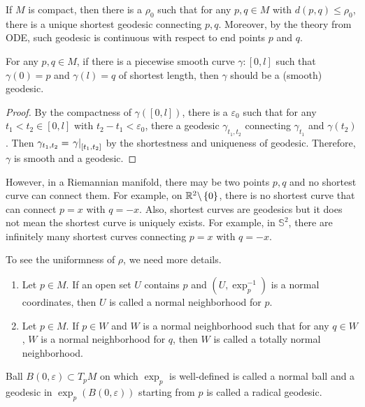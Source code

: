 \begin{cor}\label{cor:cptshort}
	If $M$ is compact, then there is a $\rho_0$ such that for any $p,q \in M$ with $d(p,q) \leq \rho_0$, there is a unique shortest geodesic connecting $p,q$. Moreover, by the theory from ODE, such geodesic is continuous with respect to end points $p$ and $q$.
\end{cor}

\begin{cor}
	For any $p,q \in M$, if there is a piecewise smooth curve $\gamma \colon [0,l]$ such that $\gamma(0) = p$ and $\gamma(l) = q$ of shortest length, then $\gamma$ should be a (smooth) geodesic.
\end{cor}
\begin{proof}
	By the compactness of $\gamma([0,l])$, there is a $\varepsilon_0$ such that for any $t_1<t_2 \in [0,l]$ with $t_2-t_1 < \varepsilon_0$, there a geodesic $\gamma_{t_1,t_2}$ connecting $\gamma_{t_1}$ and $\gamma(t_2)$. Then $\gamma_{t_1,t_2} = \left.\gamma\right\lvert_{[t_1,t_2]}$ by the shortestness and uniqueness of geodesic. Therefore, $\gamma$ is smooth and a geodesic.
\end{proof}
\begin{rmk}
	However, in a Riemannian manifold, there may be two points $p,q$ and no shortest curve can connect them. For example, on $\mathbb{R}^2 \backslash \left\{0\right\}$, there is no shortest curve that can connect $p = x$ with $q = -x$. Also, shortest curves are geodesics but it does not mean the shortest curve is uniquely exists. For example, in $\mathbb{S}^2$, there are infinitely many shortest curves connecting $p=x$ with $q = -x$.
\end{rmk}

\noindent To see the uniformness of $\rho$, we need more details.
\begin{defn}
	\begin{enumerate}[label=(\arabic{*})]
		\item Let $p \in M$. If an open set $U$ contains $p$ and $(U,\exp_p^{-1})$ is a normal coordinates, then $U$ is called a normal neighborhood for $p$.
		\item Let $p \in M$. If $p \in W$ and $W$ is a normal neighborhood such that for any $q \in W$, $W$ is a normal neighborhood for $q$, then $W$ is called a totally normal neighborhood.
	\end{enumerate}
\end{defn}
\begin{rmk}
	Ball $B(0,\varepsilon) \subset T_pM$ on which $\exp_p$ is well-defined is called a normal ball and a geodesic in $\exp_p(B(0,\varepsilon))$ starting from $p$ is called a radical geodesic.
\end{rmk}

